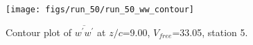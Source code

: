 \begin{figure}[H]
\centering
\texttt{[image: figs/run\_50/run\_50\_ww\_contour]}
\caption{Contour plot of $\overline{w^\prime w^\prime}$ at $z/c$=9.00, $V_{free}$=33.05, station 5.}
\label{fig:run_50_ww_contour}
\end{figure}


